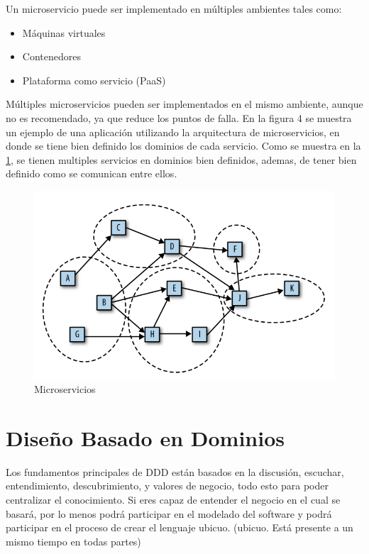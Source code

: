 \documentclass[12pt,twoside]{reedthesis}
\providecommand{\tightlist}{%
  \setlength{\itemsep}{0pt}\setlength{\parskip}{0pt}}
\theoremstyle{definition}
\theoremstyle{definition}
\theoremstyle{definition}
\theoremstyle{remark}
\begin{document}
Un microservicio puede ser implementado en múltiples ambientes tales
como:
\begin{itemize}
\tightlist
\item
  Máquinas virtuales
\item
  Contenedores
\item
  Plataforma como servicio (PaaS)
\end{itemize}
Múltiples microservicios pueden ser implementados en el mismo ambiente,
aunque no es recomendado, ya que reduce los puntos de falla. En la
figura 4 se muestra un ejemplo de una aplicación utilizando la
arquitectura de microservicios, en donde se tiene bien definido los
dominios de cada servicio. Como se muestra en la \ref{figura2}, se
tienen multiples servicios en dominios bien definidos, ademas, de tener
bien definido como se comunican entre ellos.
\begin{figure}[h!]
  \centering
  \includegraphics[scale=0.5]{./figure/Cap3/monoFig2.png}
  \caption{Microservicios}\label{figura2}
\end{figure}
\hypertarget{diseno-basado-en-dominios}{%
\section{Diseño Basado en Dominios}\label{diseno-basado-en-dominios}}

Los fundamentos principales de DDD están basados en la discusión,
escuchar, entendimiento, descubrimiento, y valores de negocio, todo esto
para poder centralizar el conocimiento. Si eres capaz de entender el
negocio en el cual se basará, por lo menos podrá participar en el
modelado del software y podrá participar en el proceso de crear el
lenguaje ubicuo. (ubicuo. Está presente a un mismo tiempo en todas
partes)
\end{document}
